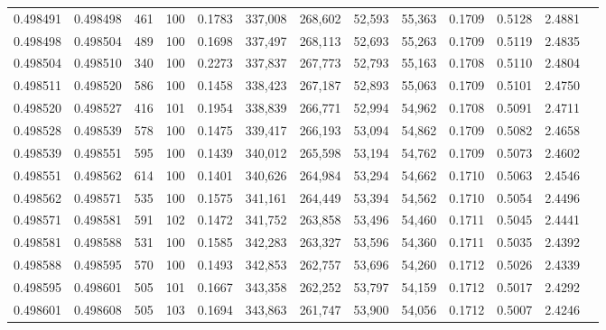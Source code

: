 \begin{tabular}{rrrrrrrrrrrrr}
0.498491 & 0.498498 &   461 & 100 &                                     0.1783 & 337,008 & 268,602 &  52,593 &  55,363 & 0.1709 & 0.5128 & 2.4881 \\
0.498498 & 0.498504 &   489 & 100 &                                     0.1698 & 337,497 & 268,113 &  52,693 &  55,263 & 0.1709 & 0.5119 & 2.4835 \\
0.498504 & 0.498510 &   340 & 100 &                                     0.2273 & 337,837 & 267,773 &  52,793 &  55,163 & 0.1708 & 0.5110 & 2.4804 \\
0.498511 & 0.498520 &   586 & 100 &                                     0.1458 & 338,423 & 267,187 &  52,893 &  55,063 & 0.1709 & 0.5101 & 2.4750 \\
0.498520 & 0.498527 &   416 & 101 &                                     0.1954 & 338,839 & 266,771 &  52,994 &  54,962 & 0.1708 & 0.5091 & 2.4711 \\
0.498528 & 0.498539 &   578 & 100 &                                     0.1475 & 339,417 & 266,193 &  53,094 &  54,862 & 0.1709 & 0.5082 & 2.4658 \\
0.498539 & 0.498551 &   595 & 100 &                                     0.1439 & 340,012 & 265,598 &  53,194 &  54,762 & 0.1709 & 0.5073 & 2.4602 \\
0.498551 & 0.498562 &   614 & 100 &                                     0.1401 & 340,626 & 264,984 &  53,294 &  54,662 & 0.1710 & 0.5063 & 2.4546 \\
0.498562 & 0.498571 &   535 & 100 &                                     0.1575 & 341,161 & 264,449 &  53,394 &  54,562 & 0.1710 & 0.5054 & 2.4496 \\
0.498571 & 0.498581 &   591 & 102 &                                     0.1472 & 341,752 & 263,858 &  53,496 &  54,460 & 0.1711 & 0.5045 & 2.4441 \\
0.498581 & 0.498588 &   531 & 100 &                                     0.1585 & 342,283 & 263,327 &  53,596 &  54,360 & 0.1711 & 0.5035 & 2.4392 \\
0.498588 & 0.498595 &   570 & 100 &                                     0.1493 & 342,853 & 262,757 &  53,696 &  54,260 & 0.1712 & 0.5026 & 2.4339 \\
0.498595 & 0.498601 &   505 & 101 &                                     0.1667 & 343,358 & 262,252 &  53,797 &  54,159 & 0.1712 & 0.5017 & 2.4292 \\
0.498601 & 0.498608 &   505 & 103 &                                     0.1694 & 343,863 & 261,747 &  53,900 &  54,056 & 0.1712 & 0.5007 & 2.4246 \\

\end{tabular}
